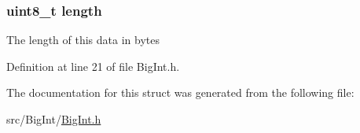 \hypertarget{struct_big_int_ab2b3adeb2a67e656ff030b56727fd0ac}{
\subsubsection[{length}]{\setlength{\rightskip}{0pt plus 5cm}uint8\_\-t {\bf length}}}
\label{struct_big_int_ab2b3adeb2a67e656ff030b56727fd0ac}
The length of this data in bytes 

Definition at line 21 of file BigInt.h.



The documentation for this struct was generated from the following file:\begin{DoxyCompactItemize}
\item 
src/BigInt/\hyperlink{_big_int_8h}{BigInt.h}\end{DoxyCompactItemize}
